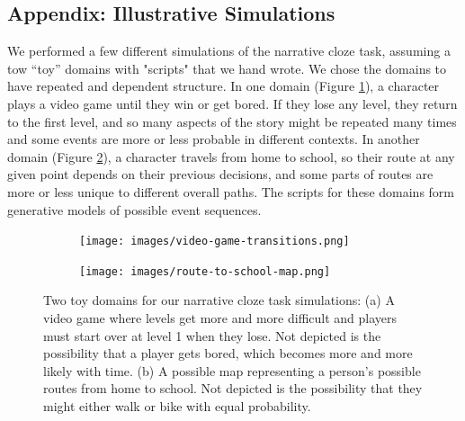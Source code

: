 \documentclass[10pt,a4paper]{article}
\newcommand{\todo}[1]{{\color{red}#1}}
\begin{document}






\setlength{\bibleftmargin}{.125in}
\setlength{\bibindent}{-\bibleftmargin}



\subsection{Appendix: Illustrative Simulations}

We performed a few different simulations of the narrative cloze task, assuming a tow ``toy'' domains with "scripts" that we hand wrote. We chose the domains to have repeated and dependent structure. In one domain (Figure \ref{fig:video-game-script}), a character plays a video game until they win or get bored. If they lose any level, they return to the first level, and so many aspects of the story might be repeated many times and some events are more or less probable in different contexts. In another domain (Figure \ref{fig:route-to-school-script}), a character travels from home to school, so their route at any given point depends on their previous decisions, and some parts of routes are more or less unique to different overall paths. The scripts for these domains form generative models of possible event sequences.

\begin{figure}
 \centering
 \begin{subfigure}{0.45\linewidth}
  \centering
  \texttt{[image: images/video-game-transitions.png]}
  \caption{}
  \label{fig:video-game-script}
 \end{subfigure}
 \begin{subfigure}{0.45\linewidth}
  \centering
  \texttt{[image: images/route-to-school-map.png]}
  \caption{}
  \label{fig:route-to-school-script}
 \end{subfigure}
 \caption{Two toy domains for our narrative cloze task simulations: (a) A video game where levels get more and more difficult and players must start over at level 1 when they lose. Not depicted is the possibility that a player gets bored, which becomes more and more likely with time. (b) A possible map representing a person's possible routes from home to school. Not depicted is the possibility that they might either walk or bike with equal probability.}
 \label{fig:scripts}
\end{figure}
\end{document}
